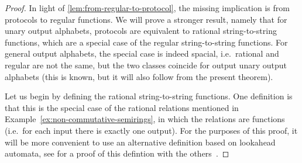 \begin{proof}
  In light of \cref{lem:from-regular-to-protocol}, the missing implication is from protocols to regular functions. We will prove a stronger result, namely that for unary output alphabets, protocols are equivalent to rational string-to-string functions, which are a special case of the regular string-to-string functions.   For general output alphabets, the special case is indeed spacial, i.e.~rational and regular are not the same, but the two classes coincide for output unary output alphabets (this is known, but it will also follow from the present theorem).

  Let us begin by defining the rational string-to-string  functions. One definition is that this is the special case of the rational relations mentioned in Example~\ref{ex:non-commutative-semirings}, in which the relations are functions (i.e.~for each input there is exactly one output). For the purposes of this proof, it will be more convenient to use an alternative definition based on lookahead automata, see for a proof of this defintion with the others~\cite[Theorem 14.1]{bojanczyk_automata_2025}. 


\end{proof}
